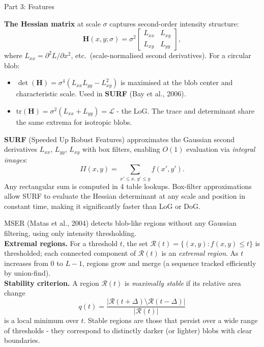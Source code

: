 \documentclass[letterpaper]{article}
\begin{document}
\begin{notes}{Part 3: Features}

\textbf{The Hessian matrix} at scale $\sigma$ captures second-order intensity structure:
$$\mathbf{H}(x,y;\sigma) = \sigma^2\begin{bmatrix} L_{xx} & L_{xy} \\ L_{xy} & L_{yy} \end{bmatrix},$$
where $L_{xx} = \partial^2 L/\partial x^2$, etc.\ (scale-normalised second derivatives). For a circular blob:
\begin{itemize}
    \item $\det(\mathbf{H}) = \sigma^4(L_{xx}L_{yy} - L_{xy}^2)$ is maximised at the blob center and characteristic scale. Used in \textbf{SURF} (Bay et al., 2006).
    \item $\mathrm{tr}(\mathbf{H}) = \sigma^2(L_{xx}+L_{yy}) = \mathcal{L}$ - the LoG. The trace and determinant share the same extrema for isotropic blobs.
\end{itemize}

\textbf{SURF} (Speeded Up Robust Features) approximates the Gaussian second derivatives $L_{xx}$, $L_{yy}$, $L_{xy}$ with box filters, enabling $O(1)$ evaluation via \emph{integral images}:
$$II(x,y) = \sum_{x'\le x,\,y'\le y} f(x',y').$$
Any rectangular sum is computed in 4 table lookups. Box-filter approximations allow SURF to evaluate the Hessian determinant at any scale and position in constant time, making it significantly faster than LoG or DoG.


MSER (Matas et al., 2004) detects blob-like regions without any Gaussian filtering, using only intensity thresholding.\\

\textbf{Extremal regions.} For a threshold $t$, the set $\mathcal{R}(t) = \{(x,y): f(x,y) \le t\}$ is thresholded; each connected component of $\mathcal{R}(t)$ is an \emph{extremal region}. As $t$ increases from $0$ to $L-1$, regions grow and merge (a sequence tracked efficiently by union-find).\\

\textbf{Stability criterion.} A region $\mathcal{R}(t)$ is \emph{maximally stable} if its relative area change
$$q(t) = \frac{|\mathcal{R}(t+\Delta) \setminus \mathcal{R}(t-\Delta)|}{|\mathcal{R}(t)|}$$
is a local minimum over $t$. Stable regions are those that persist over a wide range of thresholds - they correspond to distinctly darker (or lighter) blobs with clear boundaries.\\


\end{notes}
\end{document}
